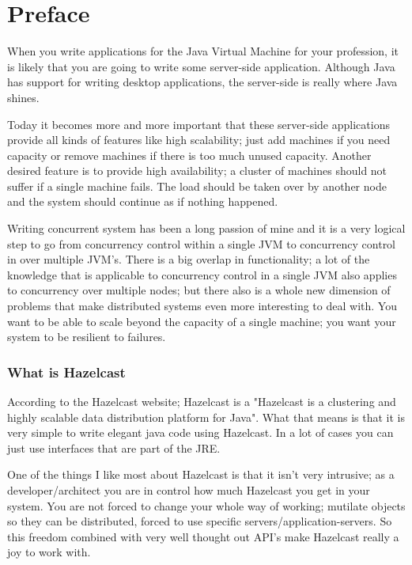 \chapter*{Preface}

When you write applications for the Java Virtual Machine for your profession, it is likely that you are going to write some server-side application. Although Java has support for writing desktop applications, the server-side is really where Java shines.

Today it becomes more and more important that these server-side applications provide all kinds of features like high scalability; just add machines if you need capacity or remove machines if there is too much unused capacity. Another desired feature is to provide high availability; a cluster of machines should not suffer if a single machine fails. The load should be taken over by another node and
the system should continue as if nothing happened.

Writing concurrent system has been a long passion of mine and it is a very logical step to go from concurrency control within a single JVM to concurrency control in over multiple JVM's. There is a big overlap in functionality; a lot of the knowledge that is applicable to concurrency control in a single JVM also applies to concurrency over multiple nodes; but there also is a whole new dimension of problems that make distributed systems even more interesting to deal with. You want to be able to scale beyond the capacity of a single machine; you want your system to be resilient to failures.

\subsection*{What is Hazelcast}
According to the Hazelcast website; Hazelcast is a "Hazelcast is a clustering and highly scalable data distribution platform for Java". What that means is that it is very simple to write elegant java code using Hazelcast. In a lot of cases you can just use interfaces that are part of the JRE.

One of the things I like most about Hazelcast is that it isn't very intrusive; as a developer/architect you are in control how much Hazelcast you get in your system. You are not forced to change your whole way of working; mutilate objects so they can be distributed, forced to use specific servers/application-servers. So this freedom combined with very well thought out API's make Hazelcast really a joy to work with.

